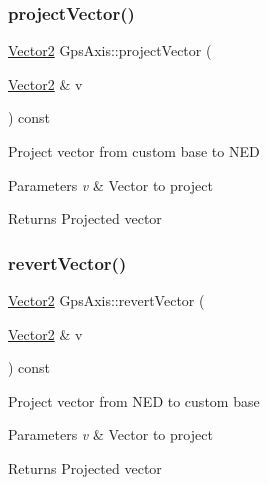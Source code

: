 \subsubsection{\texorpdfstring{project\+Vector()}{projectVector()}}
{\footnotesize\ttfamily \mbox{\hyperlink{struct_vector2}{Vector2}} Gps\+Axis\+::project\+Vector (\begin{DoxyParamCaption}\item[{\mbox{\hyperlink{struct_vector2}{Vector2}} \&}]{v }\end{DoxyParamCaption}) const}

Project vector from custom base to N\+ED 
\begin{DoxyParams}{Parameters}
{\em v} & Vector to project \\
\hline
\end{DoxyParams}
\begin{DoxyReturn}{Returns}
Projected vector 
\end{DoxyReturn}
\mbox{\label{class_m210_1_1_gps_axis_afbcf2ad8d7c70a6e3422272a9abe4086}} 
\subsubsection{\texorpdfstring{revert\+Vector()}{revertVector()}}
{\footnotesize\ttfamily \mbox{\hyperlink{struct_vector2}{Vector2}} Gps\+Axis\+::revert\+Vector (\begin{DoxyParamCaption}\item[{\mbox{\hyperlink{struct_vector2}{Vector2}} \&}]{v }\end{DoxyParamCaption}) const}

Project vector from N\+ED to custom base 
\begin{DoxyParams}{Parameters}
{\em v} & Vector to project \\
\hline
\end{DoxyParams}
\begin{DoxyReturn}{Returns}
Projected vector 
\end{DoxyReturn}
\mbox{\label{class_m210_1_1_gps_axis_ac926b543520abc8c87e3692a560954ad}} 
